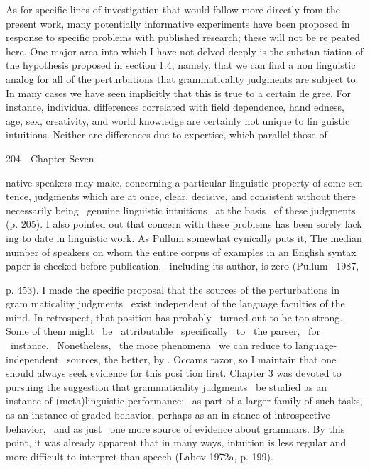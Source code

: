 \begin{styleStandard}
As for specific lines of investigation that would follow more directly from the present work, many potentially informative experiments have been proposed in response to specific problems with published research; these will not be re\- peated here. One major area into which I have not delved deeply is the substan\- tiation of the hypothesis proposed in section 1.4, namely, that we can find a non\- linguistic analog for all of the perturbations that grammaticality judgments are subject to. In many cases we have seen implicitly that this is true to a certain de\- gree. For instance, individual differences correlated with field dependence, hand\- edness, age, sex, creativity, and world knowledge are certainly not unique to lin\- guistic intuitions. Neither are differences due to expertise, which parallel those of
\end{styleStandard}


\clearpage\setcounter{page}{1}\begin{styleStandard}
204\ \ Chapter Seven
\end{styleStandard}


\begin{styleStandard}
native speakers may make, concerning a particular linguistic property of some sen\- tence, judgments which are at once, clear, decisive, and consistent without there necessarily being \ genuine linguistic intuitions \ at the basis \ of these judgments{\textquotedbl} (p. 205). I also pointed out that concern with these problems has been sorely lack\- ing to date in linguistic work. As Pullum somewhat cynically puts it, {\textquotedbl}The median number of speakers on whom the entire corpus of examples in an English syntax paper is checked before publication, \ including its author, is zero{\textquotedbl} (Pullum \ 1987,
\end{styleStandard}


\begin{styleStandard}
p. 453). I made the specific proposal that the sources of the perturbations in gram\- maticality judgments \ exist independent of the language faculties of the mind. In retrospect, that position has probably \ turned out to be too strong. Some of them might \ be \ attributable \ specifically \ to \ the parser, \ for \ instance. \ Nonetheless, \ the more phenomena \ we can reduce to language-independent \ sources, the better, by . Occam{\textquotesingle}s razor, so I maintain that one should always seek evidence for this posi\- tion first. Chapter 3 was devoted to pursuing the suggestion that grammaticality judgments \ be studied as an instance of (meta)linguistic performance: \ as part of a larger family of such tasks, as an instance of graded behavior, perhaps as an in\- stance of introspective behavior, \ and as just \ one more source of evidence about grammars. By this point, it was already apparent that {\textquotedbl}in many ways, intuition is less regular and more difficult to interpret than speech{\textquotedbl} (Labov 1972a, p. 199).
\end{styleStandard}


